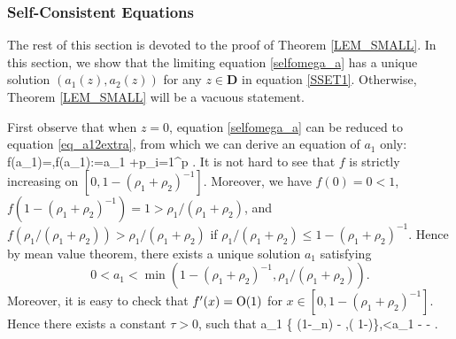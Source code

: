 
\subsubsection{Self-Consistent Equations}\label{sec contract}

The rest of this section is devoted to the proof of Theorem \ref{LEM_SMALL}. In this section, we show that the limiting equation \eqref{selfomega_a} has a unique solution $(a_1(z), a_2(z))$ for any $z\in \mathbf D$ in equation \eqref{SSET1}. Otherwise, Theorem \ref{LEM_SMALL} will be a vacuous statement. 


First observe that when $z=0$, equation \eqref{selfomega_a} can be reduced to equation \eqref{eq_a12extra}, from which we can derive an equation of $a_1$ only: 
\be\label{fa1}f(a_1)=,\quad {}\quad f(a_1):=a_1 +\cdot{}p\sum_{i=1}^p  .\ee
It is not hard to see that $f$ is strictly increasing on $[0,1-(\rho_1+\rho_2)^{-1}]$. Moreover, we have $f(0)=0<1$, $f(1-(\rho_1+\rho_2)^{-1})=1>\rho_1/(\rho_1+\rho_2)$, and $f(\rho_1/(\rho_1+\rho_2))>\rho_1/(\rho_1+\rho_2)$ if $\rho_1/(\rho_1+\rho_2)\le 1-(\rho_1+\rho_2)^{-1}$. Hence by mean value theorem, there exists a unique solution $a_1$ satisfying
$$0< a_1 <\min(1-(\rho_1+\rho_2)^{-1}, \rho_1/(\rho_1+\rho_2)).$$ 
Moreover, it is easy to check that $f'(x)=\operatorname{O}(1)$ for $x\in [0, 1-(\rho_1+\rho_2)^{-1}]$. Hence there exists a constant $\tau>0$, such that 
\be\label{a23}
 \tau \le   a_1 \le \min\left\{ (1-\gamma_n) - \tau,( 1-\tau)\right\},\quad \tau<a_1 - - \tau .
\ee 


